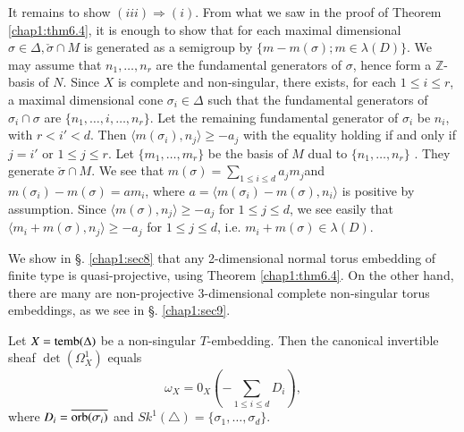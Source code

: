 	It remains to show $(iii) \Rightarrow(i)$. From what we saw in
        the proof of Theorem \ref{chap1:thm6.4}, it is enough to show
        that for each 
        maximal dimensional $\sigma \in \Delta, \check{\sigma} \cap M$
        is generated as a semigroup by $\{m - m(\sigma) ; m \in
        \lambda (D)\}$. We may assume that $n_{1}, \ldots , n_{r}$ are
        the fundamental generators of $\sigma$, hence form a
        $\mathbb{Z}$-basis of $N$. Since $X$ is complete and
        non-singular, there exists, for each $1 \leq i \leq r$, a
        maximal dimensional cone $\sigma_{i} \in \Delta$ such that the
        fundamental generators of $\sigma_{i} \cap \sigma$ are
        $\{n_{1}, \ldots , i , \ldots , n_{r}\}$. Let
        the remaining fundamental generator of $\sigma_{i}$ be
        $n_{i}$, with $r < i' < d$. Then $\langle m (\sigma_{i}),
        n_{j}\rangle \geq - a_{j}$ with the equality holding if and
        only if $j = i'$ or $1 \leq j \leq r$. Let $\{m_{1}, \ldots ,
        m_{r}\}$ be the basis of $M$ dual to $ \{n_{1}, \ldots ,
        n_{r}\} $ . They generate $\check{\sigma} \cap M$. We see that
        $m (\sigma) = \sum\limits_{1 \leq i \leq d}
        a_{j}m_{j}$\pageoriginale and $m 
        (\sigma_{i}) - m(\sigma) = am_{i}$, where $a = \langle m
        (\sigma_{i}) - m(\sigma) , n_{i} \rangle$ is positive by
        assumption. Since $\langle m (\sigma) , n_{j} \rangle \geq
        -a_{j} $ for $1 \leq j \leq d$, we see easily that $\langle
        m_{i} + m(\sigma), n_{j} \rangle \geq -a_{j}$ for $1 \leq j
        \leq d$, i.e. $m_{i} + m(\sigma) \in \lambda (D)$.  

\begin{remark*}
We show in \S. \ref{chap1:sec8} that any 2-dimensional normal torus embedding of
finite type is quasi-projective, using Theorem \ref{chap1:thm6.4}. On the other
hand, there are many are non-projective 3-dimensional complete
non-singular torus embeddings, as we see in \S. \ref{chap1:sec9}.  
\end{remark*}


\setcounter{prop}{5}
\begin{prop}[Demazure]\label{chap1:prop6.6} %
 Let $X = \operatorname{temb} (\Delta)$ be a non-singular
$T$-embedding. Then the canonical invertible sheaf $\det
(\Omega^{1}_{X})$ equals  
$$
\omega_{X} = 0_{X} (- \sum\limits_{1 \leq i \leq d} D_{i}),  
$$
where $D_{i} = \overline{\operatorname{orb}(\sigma_{i})}$ and $Sk^{1}(\triangle) =
\{\sigma_1, \ldots, \sigma_{d}\}$.  
\end{prop}

